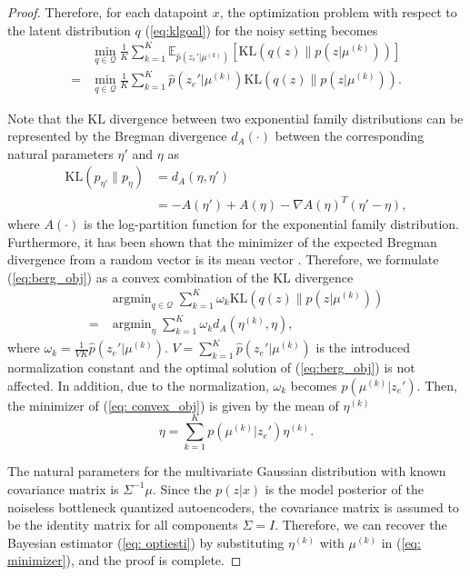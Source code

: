 \documentclass[letterpaper]{article} %
\DeclareMathOperator*{\argmin}{arg\min}
\begin{document}
\begin{proof}
	Therefore, for each datapoint $x$, the optimization problem with respect to the latent distribution $q$ (\ref{eq:klgoal}) for the noisy setting becomes
	\begin{align}
	\label{eq:berg_obj}
	&\min_{q \in \mathcal{Q}}\frac{1}{K}\sum_{k = 1}^K\mathbb{E}_{\hat{p}\left(z_e'|\mu^{(k)}\right)}\left[\text{KL}\left(q(z)\|p\left(z|\mu^{(k)}\right)\right)\right]\\
    =& \min_{q \in \mathcal{Q}}\frac{1}{K}\sum_{k = 1}^K \hat{p}\left(z_e'|\mu^{(k)}\right)\text{KL}\left(q(z)\|p\left(z|\mu^{(k)}\right)\right).
	\end{align}

	Note that the KL divergence between two exponential family distributions can be represented by the Bregman divergence $d_A(\cdot)$ between the corresponding natural parameters $\eta'$ and $\eta$ as
	\begin{align}
	\text{KL}(p_{\eta'}\|p_{\eta}) &=  d_A(\eta, \eta')\\
	&=-A(\eta')+A(\eta)-\nabla A(\eta)^T(\eta'-\eta) ,
	\end{align}
	where $A(\cdot)$ is the log-partition function for the exponential family distribution. Furthermore, it has been shown that the minimizer of the expected Bregman divergence from a random vector is its mean vector \cite{bregman}. Therefore, we formulate (\ref{eq:berg_obj}) as a convex combination of the KL divergence
	\begin{align}
	\label{eq: convex_obj}
	&\argmin_{q \in \mathcal{Q}} \sum_{k = 1}^ K\omega_k \text{KL}\left(q(z)\| p\left(z|\mu^{(k)}\right)\right) \\
	=&\argmin_{\eta}\sum_{k = 1}^K \omega_k d_A(\eta^{(k)}, \eta),
	\end{align}
	where $\omega_k = \frac{1}{VK}\hat{p}\left(z_e'|\mu^{(k)}\right)$. $V = \sum_{k = 1}^K\hat{p}\left(z_e'|\mu^{(k)}\right)$ is the introduced normalization constant and the optimal solution of (\ref{eq:berg_obj}) is not affected. In addition, due to the normalization, $\omega_k$ becomes $p\left(\mu^{(k)}|z_e'\right)$. Then, the minimizer of (\ref{eq: convex_obj}) is given by the mean of $\eta^{(k)}$
	\begin{equation}
	\label{eq: minimizer}
	\eta =\sum_{k = 1}^{K}p\left(\mu^{(k)}|z_e'\right)\eta^{(k)}.
	\end{equation}

	The natural parameters for the multivariate Gaussian distribution with known covariance matrix is $\Sigma^{-1}\mu$. Since the $p(z|x)$ is the model posterior of the noiseless bottleneck quantized autoencoders, the covariance matrix is assumed to be the identity matrix for all components $\Sigma = I$. Therefore, we can recover the Bayesian estimator (\ref{eq: optiesti}) by substituting $\eta^{(k)}$ with $\mu^{(k)}$ in (\ref{eq: minimizer}), and the proof is complete.
\end{proof}
\end{document}
